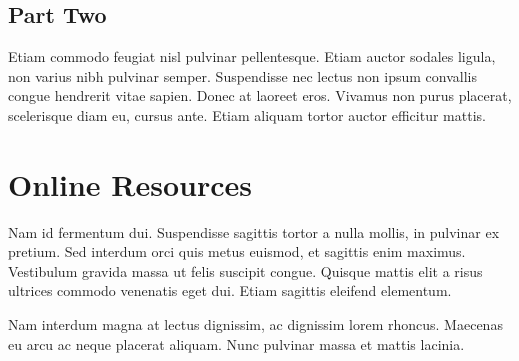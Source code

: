 \documentclass[sigplan,screen]{acmart}
\begin{document}
\subsection{Part Two}

Etiam commodo feugiat nisl pulvinar pellentesque. Etiam auctor sodales
ligula, non varius nibh pulvinar semper. Suspendisse nec lectus non
ipsum convallis congue hendrerit vitae sapien. Donec at laoreet
eros. Vivamus non purus placerat, scelerisque diam eu, cursus
ante. Etiam aliquam tortor auctor efficitur mattis.

\section{Online Resources}

Nam id fermentum dui. Suspendisse sagittis tortor a nulla mollis, in
pulvinar ex pretium. Sed interdum orci quis metus euismod, et sagittis
enim maximus. Vestibulum gravida massa ut felis suscipit
congue. Quisque mattis elit a risus ultrices commodo venenatis eget
dui. Etiam sagittis eleifend elementum.

Nam interdum magna at lectus dignissim, ac dignissim lorem
rhoncus. Maecenas eu arcu ac neque placerat aliquam. Nunc pulvinar
massa et mattis lacinia.
\end{document}
